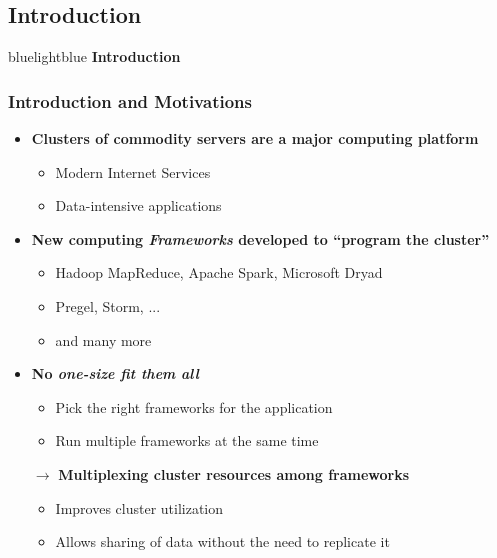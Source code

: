 
\subsection{Introduction}
\begin{frame}
 \begin{colorblock}{blue}{lightblue}{ }
    \Large \textbf{Introduction}
  \end{colorblock}
\end{frame}

\begin{frame}
\frametitle{Introduction and Motivations}
\begin{itemize}
	\item {\bf Clusters of commodity servers are a major computing platform}
	\begin{itemize}
		\item Modern Internet Services
		\item Data-intensive applications
	\end{itemize}
	\item {\bf New computing {\it Frameworks} developed to ``program the cluster''}
	\begin{itemize}
		\item Hadoop MapReduce, Apache Spark, Microsoft Dryad
		\item Pregel, Storm, ...
		\item and many more
	\end{itemize}
	\item {\bf No {\it one-size fit them all}}
	\begin{itemize}
		\item Pick the right frameworks for the application
		\item Run multiple frameworks at the same time
	\end{itemize}
	\item[$\to$] {\bf Multiplexing cluster resources among frameworks}
	\begin{itemize}
		\item Improves cluster utilization
		\item Allows sharing of data without the need to replicate it
	\end{itemize}
\end{itemize}
\end{frame}

